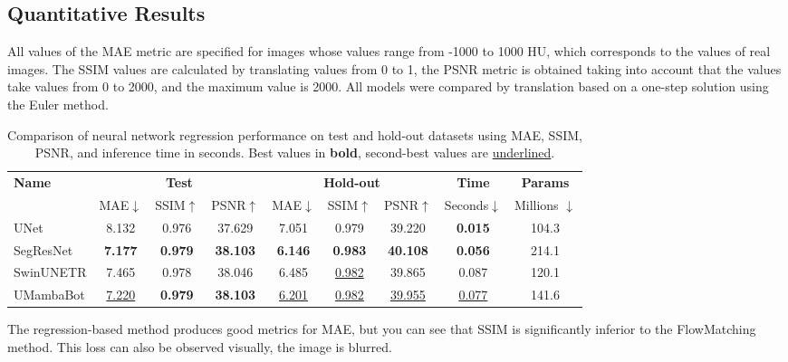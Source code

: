 \documentclass{article}
\begin{document}
\subsection{Quantitative Results}
All values of the MAE metric are specified for images whose values range from -1000 to 1000 HU, which corresponds to the values of real images. The SSIM values are calculated by translating values from 0 to 1, the PSNR metric is obtained taking into account that the values take values from 0 to 2000, and the maximum value is 2000. All models were compared by translation based on a one-step solution using the Euler method.
\begin{table}[h!]
\centering
\begin{tabular}{lcccccccc}
\toprule
\textbf{Name} 
  & \multicolumn{3}{c}{\textbf{Test}} 
  & \multicolumn{3}{c}{\textbf{Hold-out}} 
  & \textbf{Time} & \textbf{Params}\\
\cmidrule(lr){2-4} \cmidrule(lr){5-7}
   & MAE$\downarrow$ & SSIM$\uparrow$ & PSNR$\uparrow$  
  & MAE$\downarrow$ & SSIM$\uparrow$ & PSNR$\uparrow$ 
  & Seconds$\downarrow$ & Millions $\downarrow$ \\
\midrule
UNet       & 8.132 & 0.976 & 37.629 & 7.051 & 0.979 & 39.220 & \textbf{0.015} & 104.3\\
SegResNet  & \textbf{7.177} & \textbf{0.979} & \textbf{38.103} & \textbf{6.146} & \textbf{0.983} & \textbf{40.108} & \textbf{0.056} & 214.1 \\
SwinUNETR  & 7.465 & 0.978 & 38.046 & 6.485 & \underline{0.982} & 39.865 & 0.087 & 120.1\\
UMambaBot  & \underline{7.220} & \textbf{0.979} & \textbf{38.103} & \underline{6.201} & \underline{0.982} & \underline{39.955} & \underline{0.077} & 141.6\\
\bottomrule
\end{tabular}
\vspace{0.2cm}
\caption{Comparison of neural network regression performance on test and hold-out datasets using MAE, SSIM, PSNR, and inference time in seconds. Best values in \textbf{bold}, second-best values are \underline{underlined}.}
\label{tab:metrics_comparison}
\end{table}

The regression-based method produces good metrics for MAE, but you can see that SSIM is significantly inferior to the FlowMatching method. This loss can also be observed visually, the image is blurred.
\end{document}
